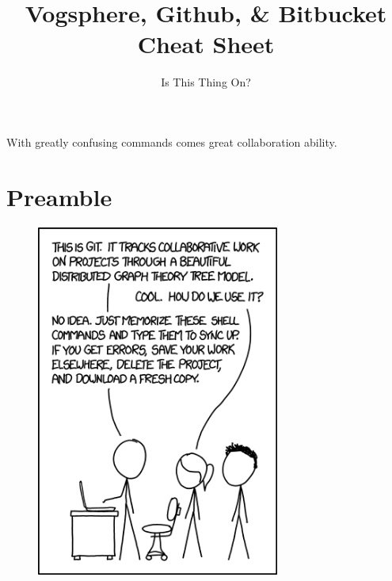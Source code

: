 \documentclass{42-en}
\begin{document}
\title{Vogsphere, Github, \& Bitbucket Cheat Sheet}
\subtitle{Is This Thing On?}


\summary
{
With greatly confusing commands comes great collaboration ability.
}

\maketitle

\tableofcontents


\startexercices



\chapter{Preamble}

\begin{figure}[H]
    \begin{center}
        \includegraphics[width=8cm]{images/xkcd_git.png}
    \end{center}
\end{figure}
\end{document}
